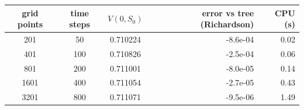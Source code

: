 \begin{tabular}{cccrr}
\toprule
grid points & time steps & $V(0,S_0)$ & error vs tree (Richardson) & CPU (s) \\
\midrule
201 & 50 & 0.710224 & -8.6e-04 & 0.02 \\
401 & 100 & 0.710826 & -2.5e-04 & 0.06 \\
801 & 200 & 0.711001 & -8.0e-05 & 0.14 \\
1601 & 400 & 0.711054 & -2.7e-05 & 0.43 \\
3201 & 800 & 0.711071 & -9.5e-06 & 1.49 \\
\bottomrule
\end{tabular}
